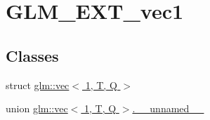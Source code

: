 \hypertarget{group__ext__vec1}{}\section{G\+L\+M\+\_\+\+E\+X\+T\+\_\+vec1}
\label{group__ext__vec1}
\subsection*{Classes}
\begin{DoxyCompactItemize}
\item 
struct \hyperlink{structglm_1_1vec_3_011_00_01T_00_01Q_01_4}{glm\+::vec$<$ 1, T, Q $>$}
\item 
union \hyperlink{group__ext__vec1_d4/d40/unionglm_1_1vec_3_011_00_01T_00_01Q_01_4_8____unnamed____}{glm\+::vec$<$ 1, T, Q $>$.\+\_\+\+\_\+unnamed\+\_\+\+\_\+}
\end{DoxyCompactItemize}
